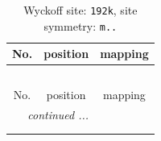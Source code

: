 \documentclass[fleqn,8pt]{jsarticle}
\begin{document}
\renewcommand{\arraystretch}{1.2}
\begin{longtable}{ccc}
\caption{Wyckoff site: {\tt 192k}, site symmetry: {\tt m..}}
 \\
 \hline \hline
No. & position & mapping \\ \hline \endfirsthead

\multicolumn{2}{l}{\tablename\ \thetable{}} \\
 \hline \hline
No. & position & mapping \\ \hline \endhead

 \hline \hline
\multicolumn{2}{r}{\footnotesize\it continued ...} \\ \endfoot

 \hline \hline
\multicolumn{2}{r}{} \\ \endlastfoot


\end{longtable}
\end{document}
